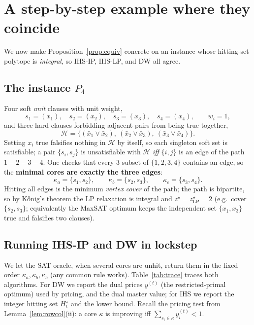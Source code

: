 \documentclass[11pt,a4paper]{article}
\begin{document}
\section{A step-by-step example where they coincide}
\label{sec:worked}

We now make Proposition~\ref{prop:equiv} concrete on an instance whose
hitting-set polytope is \emph{integral}, so IHS-IP, IHS-LP, and DW all agree.

\subsection{The instance \texorpdfstring{$P_4$}{P4}}

Four soft \emph{unit} clauses with unit weight,
\[
s_1=(x_1),\quad s_2=(x_2),\quad s_3=(x_3),\quad s_4=(x_4),\qquad w_i = 1,
\]
and three hard clauses forbidding adjacent pairs from being true together,
\[
\mathcal{H} = \{(\bar x_1 \vee \bar x_2),\ (\bar x_2 \vee \bar x_3),\ (\bar x_3 \vee \bar x_4)\}.
\]
Setting $x_i$ true falsifies nothing in $\mathcal{H}$ by itself, so each
singleton soft set is satisfiable; a pair $\{s_i,s_j\}$ is unsatisfiable with
$\mathcal{H}$ \emph{iff} $\{i,j\}$ is an edge of the path $1{-}2{-}3{-}4$. One
checks that every $3$-subset of $\{1,2,3,4\}$ contains an edge, so the
\textbf{minimal cores are exactly the three edges}:
\[
\kappa_a = \{s_1,s_2\},\qquad \kappa_b = \{s_2,s_3\},\qquad \kappa_c = \{s_3,s_4\}.
\]
Hitting all edges is the minimum \emph{vertex cover} of the path; the path is
bipartite, so by K\H{o}nig's theorem the LP relaxation is integral and
$z^\star = z^\star_{\mathrm{LP}} = 2$ (e.g.\ cover $\{s_2,s_3\}$; equivalently
the MaxSAT optimum keeps the independent set $\{x_1,x_3\}$ true and falsifies
two clauses).

\subsection{Running IHS-IP and DW in lockstep}

We let the SAT oracle, when several cores are unhit, return them in the fixed
order $\kappa_a, \kappa_b, \kappa_c$ (any common rule works). Table~\ref{tab:trace}
traces both algorithms. For DW we report the dual prices $y^{(t)}$ (the
restricted-primal optimum) used by pricing, and the dual master value; for
IHS we report the integer hitting set $H_t^\star$ and the lower bound. Recall
the pricing test from Lemma~\ref{lem:rowcol}(ii): a core $\kappa$ is improving
iff $\sum_{s_i\in\kappa} y^{(t)}_i < 1$.
\end{document}
